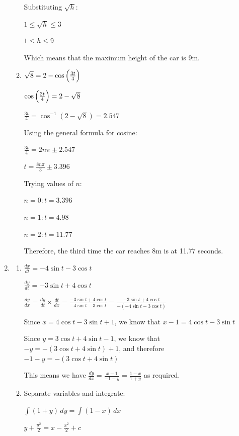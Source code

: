 \documentclass[../main.tex]{subfiles}
\begin{document}
\begin{spacing}{1.5}
\begin{enumerate}[itemsep=0.7cm]
\begin{enumerate}[itemsep=0.5cm]
        Substituting $\sqrt{h}$:

        $1 \leq \sqrt{h} \leq 3$

        $1 \leq h \leq 9$

        Which means that the maximum height of the car is 9m.

        \item 
        $\sqrt{8}=2-\cos{\Bigl(\frac{3t}{4}\Bigr)}$

        $\cos{\Bigl(\frac{3t}{4}\Bigr)}=2-\sqrt{8}$

        $\frac{3t}{4}=\cos^{-1}(2-\sqrt{8})=2.547$

        Using the general formula for cosine:

        $\frac{3t}{4}=2n\pi \pm 2.547$

        $t=\frac{8n\pi}{3}\pm 3.396$

        Trying values of $n$:

        $n=0 : t=3.396$

        $n=1 : t=4.98$

        $n=2 : t=11.77$

        Therefore, the third time the car reaches 8m is at 11.77 seconds.

    \end{enumerate}

    \item 
    \begin{enumerate}[itemsep=0.7cm]
        \item 
        $\frac{dx}{dt}=-4\sin{t}-3\cos{t}$

        $\frac{dy}{dt}=-3\sin{t}+4\cos{t}$

        $\frac{dy}{dx}=\frac{dy}{dt}\times \frac{dt}{dx}=\frac{-3\sin{t}+4\cos{t}}{-4\sin{t}-3\cos{t}}=\frac{-3\sin{t}+4\cos{t}}{-(-4\sin{t}-3\cos{t})}$

        Since $x=4\cos{t}-3\sin{t}+1$, we know that $x-1=4\cos{t}-3\sin{t}$

        Since $y=3\cos{t}+4\sin{t}-1$, we know that $-y=-(3\cos{t}+4\sin{t})+1$, and therefore $-1-y=-(3\cos{t}+4\sin{t})$

        This means we have $\frac{dy}{dx}=\frac{x-1}{-1-y}=\frac{1-x}{1+y}$ as required.

        \item 
        Separate variables and integrate:

        $\int (1+y)\,dy=\int (1-x)\,dx$

        $y+\frac{y^2}{2}=x-\frac{x^2}{2}+c$


\end{enumerate}
\end{enumerate}
\end{spacing}
\end{document}
